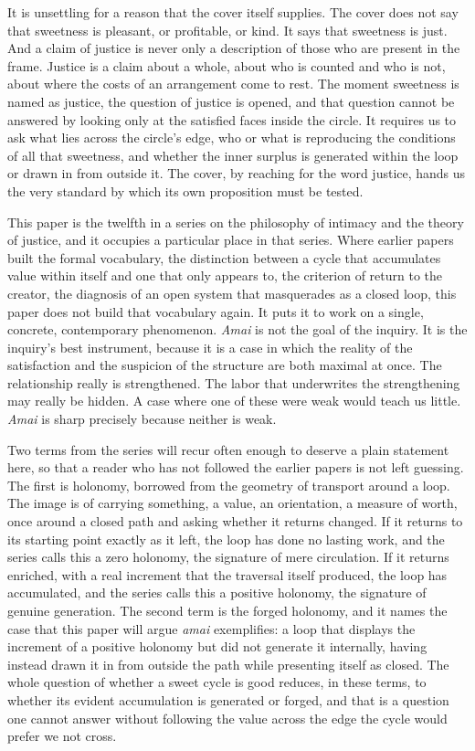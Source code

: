 \documentclass[11pt,a4paper]{article}
\begin{document}
It is unsettling for a reason that the cover itself supplies. The cover does not say that sweetness is pleasant, or profitable, or kind. It says that sweetness is just. And a claim of justice is never only a description of those who are present in the frame. Justice is a claim about a whole, about who is counted and who is not, about where the costs of an arrangement come to rest. The moment sweetness is named as justice, the question of justice is opened, and that question cannot be answered by looking only at the satisfied faces inside the circle. It requires us to ask what lies across the circle's edge, who or what is reproducing the conditions of all that sweetness, and whether the inner surplus is generated within the loop or drawn in from outside it. The cover, by reaching for the word justice, hands us the very standard by which its own proposition must be tested.

This paper is the twelfth in a series on the philosophy of intimacy and the theory of justice, and it occupies a particular place in that series. Where earlier papers built the formal vocabulary, the distinction between a cycle that accumulates value within itself and one that only appears to, the criterion of return to the creator, the diagnosis of an open system that masquerades as a closed loop, this paper does not build that vocabulary again. It puts it to work on a single, concrete, contemporary phenomenon. \textit{Amai} is not the goal of the inquiry. It is the inquiry's best instrument, because it is a case in which the reality of the satisfaction and the suspicion of the structure are both maximal at once. The relationship really is strengthened. The labor that underwrites the strengthening may really be hidden. A case where one of these were weak would teach us little. \textit{Amai} is sharp precisely because neither is weak.

Two terms from the series will recur often enough to deserve a plain statement here, so that a reader who has not followed the earlier papers is not left guessing. The first is holonomy, borrowed from the geometry of transport around a loop. The image is of carrying something, a value, an orientation, a measure of worth, once around a closed path and asking whether it returns changed. If it returns to its starting point exactly as it left, the loop has done no lasting work, and the series calls this a zero holonomy, the signature of mere circulation. If it returns enriched, with a real increment that the traversal itself produced, the loop has accumulated, and the series calls this a positive holonomy, the signature of genuine generation. The second term is the forged holonomy, and it names the case that this paper will argue \textit{amai} exemplifies: a loop that displays the increment of a positive holonomy but did not generate it internally, having instead drawn it in from outside the path while presenting itself as closed. The whole question of whether a sweet cycle is good reduces, in these terms, to whether its evident accumulation is generated or forged, and that is a question one cannot answer without following the value across the edge the cycle would prefer we not cross.
\end{document}
